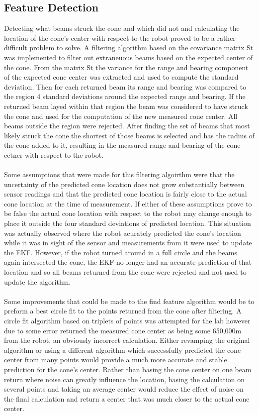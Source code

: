 \documentclass[letterpaper,12pt]{article}
\begin{document}
\subsection{Feature Detection}
Detecting what beams struck the cone and which did not and calculating the location of the cone's center with respect to the robot proved to be a rather difficult problem to solve. A filtering algorithm based on the covariance matrix St was implemented to filter out extraneuous beams based on the expected center of the cone. From the matrix St the variance for the range and bearing component of the expected cone center was extracted and used to compute the standard deviation. Then for each returned beam its range and bearing was compared to the region 4 standard deviations around the expected range and bearing. If the returned beam layed within that region the beam was considered to have struck the cone and used for the computation of the new measured cone center. All beams outside the region were rejected. After finding the set of beams that most likely struck the cone the shortest of those beams is selected and has the radius of the cone added to it, resulting in the measured range and bearing of the cone cetner with respect to the robot. 
\\\\
Some assumptions that were made for this filtering algoirthm were that the uncertainty of the predicted cone location does not grow substantially between sensor readings and that the predicted cone location is fairly close to the actual cone location at the time of measurement. If either of these assumptions prove to be false the actual cone location with respect to the robot may change enough to place it outside the four standard deviations of predicted location. This situation was actually observed where the robot acurately predicted the cone's location while it was in sight of the sensor and measurements from it were used to update the EKF. However, if the robot turned around in a full circle and the beams again intersected the cone, the EKF no longer had an accurate prediction of that location and so all beams returned from the cone were rejected and not used to update the algorithm. 
\\\\
Some improvements that could be made to the find feature algorithm would be to preform a best circle fit to the points returned from the cone after filtering. A circle fit algorithm based on triplets of points was attempted for the lab however due to some error returned the measured cone center as being some 650,000m from the robot, an obviously incorrect calculation. Either revamping the original algorithm or using a different algorithm which successfully predicted the cone center from many points would provide a much more accurate and stable prediction for the cone's center. Rather than basing the cone center on one beam return where noise can greatly influence the location, basing the calculation on several points and taking an average center would reduce the effect of noise on the final calculation and return a center that was much closer to the actual cone center. 
\end{document}
